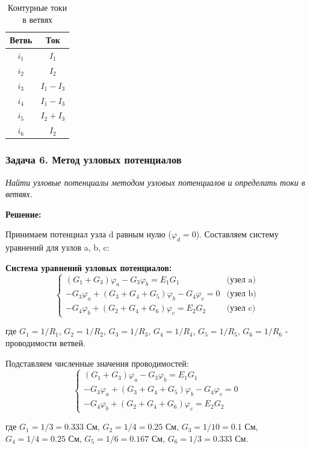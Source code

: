 \begin{table}[H]
\centering
\begin{tabular}{|c|c|}
\hline
\textbf{Ветвь} & \textbf{Ток} \\
\hline
$i_1$ & $I_1$ \\
\hline
$i_2$ & $I_2$ \\
\hline
$i_3$ & $I_1 - I_3$ \\
\hline
$i_4$ & $I_1 - I_3$ \\
\hline
$i_5$ & $I_2 + I_3$ \\
\hline
$i_6$ & $I_2$ \\
\hline
\end{tabular}
\caption{Контурные токи в ветвях}
\label{tab:loop_to_branch_currents}
\end{table}


\subsubsection{Задача 6. Метод узловых потенциалов}
\textit{Найти узловые потенциалы методом узловых потенциалов и определить токи в ветвях.}

\textbf{Решение:}

Принимаем потенциал узла d равным нулю ($\varphi_d = 0$). Составляем систему уравнений для узлов a, b, c:

\textbf{Система уравнений узловых потенциалов:}
$$\begin{cases}
(G_1 + G_3)\varphi_a - G_3\varphi_b = E_1 G_1 & \text{(узел a)} \\
-G_3\varphi_a + (G_3 + G_4 + G_5)\varphi_b - G_4\varphi_c = 0 & \text{(узел b)} \\
-G_4\varphi_b + (G_2 + G_4 + G_6)\varphi_c = E_2 G_2 & \text{(узел c)}
\end{cases}$$

где $G_1 = 1/R_1$, $G_2 = 1/R_2$, $G_3 = 1/R_3$, $G_4 = 1/R_4$, $G_5 = 1/R_5$, $G_6 = 1/R_6$ - проводимости ветвей.

Подставляем численные значения проводимостей:
$$\begin{cases}
(G_1 + G_3)\varphi_a - G_3\varphi_b = E_1 G_1 \\
-G_3\varphi_a + (G_3 + G_4 + G_5)\varphi_b - G_4\varphi_c = 0 \\
-G_4\varphi_b + (G_2 + G_4 + G_6)\varphi_c = E_2 G_2
\end{cases}$$

где $G_1 = 1/3 = 0.333$ См, $G_2 = 1/4 = 0.25$ См, $G_3 = 1/10 = 0.1$ См, $G_4 = 1/4 = 0.25$ См, $G_5 = 1/6 = 0.167$ См, $G_6 = 1/3 = 0.333$ См.

